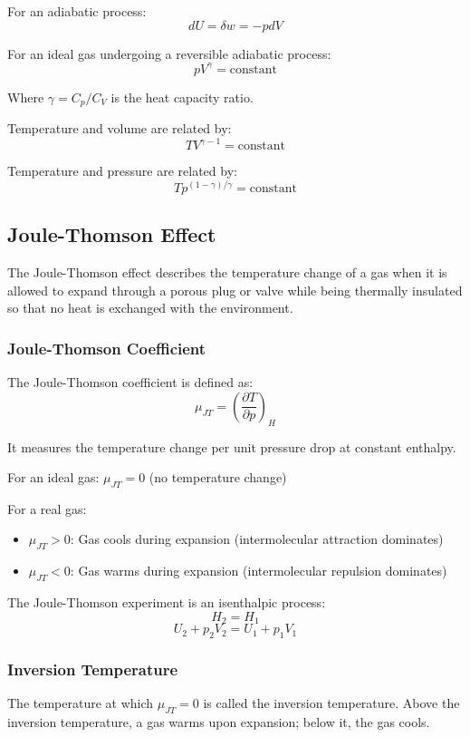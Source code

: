 \documentclass{article}
\theoremstyle{definition}
\begin{document}
For an adiabatic process:
\[
dU = \delta w = -pdV
\]

For an ideal gas undergoing a reversible adiabatic process:
\[
pV^\gamma = \text{constant}
\]

Where $\gamma = C_p/C_V$ is the heat capacity ratio.

Temperature and volume are related by:
\[
TV^{\gamma-1} = \text{constant}
\]

Temperature and pressure are related by:
\[
T p^{(1-\gamma)/\gamma} = \text{constant}
\]

\subsection{Joule-Thomson Effect}

The Joule-Thomson effect describes the temperature change of a gas when it is allowed to expand through a porous plug or valve while being thermally insulated so that no heat is exchanged with the environment.

\subsubsection{Joule-Thomson Coefficient}

The Joule-Thomson coefficient is defined as:
\[
\mu_{JT} = \left(\frac{\partial T}{\partial p}\right)_H
\]

It measures the temperature change per unit pressure drop at constant enthalpy.

For an ideal gas: $\mu_{JT} = 0$ (no temperature change)

For a real gas:
\begin{itemize}
    \item $\mu_{JT} > 0$: Gas cools during expansion (intermolecular attraction dominates)
    \item $\mu_{JT} < 0$: Gas warms during expansion (intermolecular repulsion dominates)
\end{itemize}

The Joule-Thomson experiment is an isenthalpic process:
\[
H_2 = H_1
\]
\[
U_2 + p_2V_2 = U_1 + p_1V_1
\]

\subsubsection{Inversion Temperature}

The temperature at which $\mu_{JT} = 0$ is called the inversion temperature. Above the inversion temperature, a gas warms upon expansion; below it, the gas cools.
\end{document}
